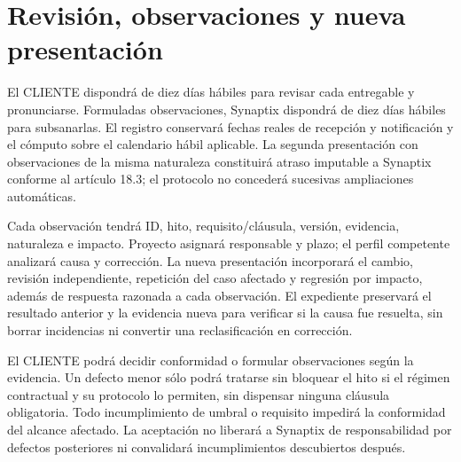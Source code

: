 \section{Revisión, observaciones y nueva presentación}
El CLIENTE dispondrá de diez días hábiles para revisar cada entregable y pronunciarse. Formuladas observaciones, Synaptix dispondrá de diez días hábiles para subsanarlas. El registro conservará fechas reales de recepción y notificación y el cómputo sobre el calendario hábil aplicable. La segunda presentación con observaciones de la misma naturaleza constituirá atraso imputable a Synaptix conforme al artículo 18.3; el protocolo no concederá sucesivas ampliaciones automáticas. \parencite[art.~18.3, p.~13]{sd9-ba}

Cada observación tendrá ID, hito, requisito/cláusula, versión, evidencia, naturaleza e impacto. Proyecto asignará responsable y plazo; el perfil competente analizará causa y corrección. La nueva presentación incorporará el cambio, revisión independiente, repetición del caso afectado y regresión por impacto, además de respuesta razonada a cada observación. El expediente preservará el resultado anterior y la evidencia nueva para verificar si la causa fue resuelta, sin borrar incidencias ni convertir una reclasificación en corrección.

El CLIENTE podrá decidir conformidad o formular observaciones según la evidencia. Un defecto menor sólo podrá tratarse sin bloquear el hito si el régimen contractual y su protocolo lo permiten, sin dispensar ninguna cláusula obligatoria. Todo incumplimiento de umbral o requisito impedirá la conformidad del alcance afectado. La aceptación no liberará a Synaptix de responsabilidad por defectos posteriores ni convalidará incumplimientos descubiertos después. \parencite[art.~18.4, p.~13]{sd9-ba}

